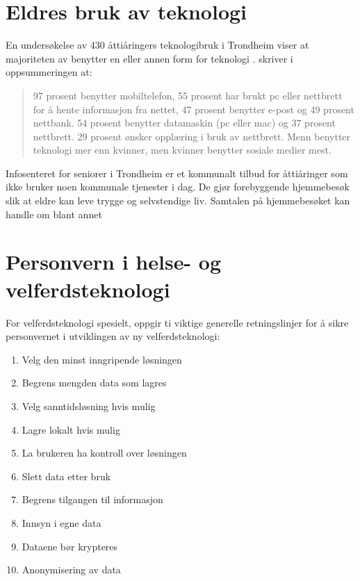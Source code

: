 \section{Eldres bruk av teknologi}
En undersøkelse av 430 åttiåringers teknologibruk i Trondheim viser at majoriteten av benytter en eller annen
form for teknologi \citep{ergoterapeuten_seniorer}. \citet{ergoterapeuten_seniorer} skriver i oppsummeringen at:
\blockquote{97 prosent benytter mobiltelefon, 55 prosent har brukt pc eller nettbrett
    for å hente informasjon fra nettet, 47 prosent benytter e-post og
    49 prosent nettbank. 54 prosent benytter datamaskin (pc eller mac)
    og 37 prosent nettbrett. 29 prosent ønsker opplæring i bruk av nettbrett.
    Menn benytter teknologi mer enn kvinner, men kvinner benytter
    sosiale medier mest.}
Infosenteret for seniorer i Trondheim er et kommunalt tilbud for åttiåringer som ikke bruker
noen kommunale tjenester i dag. De gjør forebyggende hjemmebesøk slik at eldre kan leve
trygge og selvstendige liv. Samtalen på hjemmebesøket kan handle om blant annet

\section{Personvern i helse- og velferdsteknologi}
For velferdsteknologi spesielt, oppgir \citet{datatilsynet_welfare} ti viktige generelle retningslinjer for å sikre personvernet
i utviklingen av ny velferdsteknologi:

\begin{enumerate}
    \item Velg den minst inngripende løsningen
    \item Begrens mengden data som lagres
    \item Velg sanntidsløsning hvis mulig
    \item Lagre lokalt hvis mulig
    \item La brukeren ha kontroll over løsningen
    \item Slett data etter bruk
    \item Begrens tilgangen til informasjon
    \item Innsyn i egne data
    \item Dataene bør krypteres
    \item Anonymisering av data
\end{enumerate}

